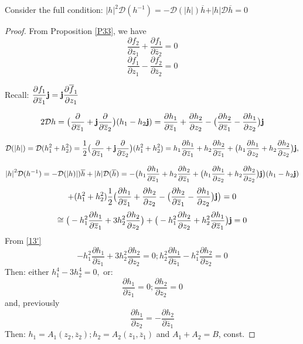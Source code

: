 \documentclass[12pt]{amsart}
\theoremstyle{definition}
\begin{document}
Consider the full condition: $\vert h\vert^2{\mathcal D}(h^{-1})=-{\mathcal D}(\vert h\vert)\overline h+\vert h\vert {\mathcal D}\overline h=0$
\begin{proof}

From Proposition \ref{P33}, we have 
$$
\frac{\partial f_2}{\partial z_1}+\frac{\partial f_1}{\partial \overline z_2}=0 
$$ 
$$
\frac{\partial f_1}{\partial z_1}-\frac{\partial f_2}{\partial\overline z_2}=0
$$ 

Recall: $\displaystyle\frac{\partial 
f_1}{\partial\overline z_1}{\bf j}={\bf j}\frac{\partial\overline 
f_1}{\partial z_1}$

$$
2{\mathcal D} h=\big(\frac{\partial}{\partial\overline z_1}
+{\bf j}\frac{\partial}{\partial\overline z_2}\big)( h_1-h_2{\bf j})= \frac{\partial h_1}{\partial\overline z_1}+\frac{\partial h_2}{\partial z_2}-\big(\frac{\partial h_2}{\partial\overline z_1}-\frac{\partial h_1}{\partial z_2}\big){\bf j}
$$

$${\mathcal D}(\vert h\vert)={\mathcal D}(h_1^2+h_2^2)=\frac{1}{2}\big(\frac{\partial}{\partial\overline z_1}
+{\bf j}\frac{\partial}{\partial\overline z_2}\big)(h_1^2+h_2^2)=
h_1\frac{\partial h_1}{\partial\overline z_1} +h_2\frac{\partial h_2}{\partial\overline z_1} +\big(h_1\frac{\partial h_1}{\partial z_2} +h_2\frac{\partial h_2}{\partial z_2}\big){\bf j},
$$

$$
{\vert h\vert}^2{\mathcal D}(h^{-1})=-{\mathcal D}(\vert h)\vert)\overline h+\vert h\vert {\mathcal D}(\overline {h})=-\big(h_1\frac{\partial h_1}{\partial\overline z_1} +h_2\frac{\partial h_2}{\partial\overline z_1} +\big(h_1\frac{\partial h_1}{\partial z_2} +h_2\frac{\partial h_2}{\partial z_2}\big){\bf j}\big)(h_1-h_2{\bf j})
$$
$$
+(h_1^2+h_2^2)\frac{1}{2}\big(\frac{\partial h_1}{\partial\overline z_1}+\frac{\partial h_2}{\partial z_2}-\big(\frac{\partial h_2}{\partial\overline z_1}-\frac{\partial h_1}{\partial z_2}\big){\bf j}\big)=0
$$
\begin{equation}\label{13'}
\cong\big(-h_1^2\frac{\partial h_1}{\partial\overline z_1}+3h_2^2\frac{\partial h_2}{\partial z_2}\big)+\big(-h_1^2\frac{\partial h_2}{\partial z_2}+h_2^2\frac{\partial h_1}{\partial\overline z_1}\big){\bf j}=0 
\end{equation}
{}From \eqref{13'}
$$
-h_1^2\frac{\partial h_1}{\partial\overline z_1}+3h_2^2\frac{\partial h_2}{\partial z_2}=0; h_2^2\frac{\partial h_1}{\partial\overline z_1}-h_1^2\frac{\partial h_2}{\partial z_2}=0
$$
Then: either $h_1^4-3h_2^4=0,$ or:
$$
\frac{\partial h_1}{\partial\overline z_1}=0; \frac{\partial h_2}{\partial z_2}=0
$$
and, previously
$$
\frac{\partial h_1}{\partial z_2}=-\frac{\partial h_2}{\partial\overline z_1}
$$
Then: $h_1=A_1(z_2,\overline z_2); h_2=A_2(z_1,\overline z_1)$ and $A_1+A_2=B$, const. \end{proof}
\end{document}
